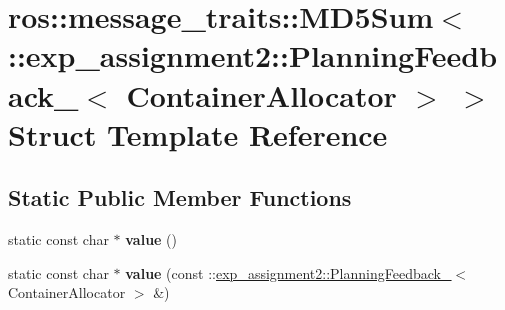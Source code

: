 \hypertarget{structros_1_1message__traits_1_1MD5Sum_3_01_1_1exp__assignment2_1_1PlanningFeedback___3_01ContainerAllocator_01_4_01_4}{}\section{ros\+:\+:message\+\_\+traits\+:\+:M\+D5\+Sum$<$ \+:\+:exp\+\_\+assignment2\+:\+:Planning\+Feedback\+\_\+$<$ Container\+Allocator $>$ $>$ Struct Template Reference}
\label{structros_1_1message__traits_1_1MD5Sum_3_01_1_1exp__assignment2_1_1PlanningFeedback___3_01ContainerAllocator_01_4_01_4}
\subsection*{Static Public Member Functions}
\begin{DoxyCompactItemize}
\item 
\mbox{\label{structros_1_1message__traits_1_1MD5Sum_3_01_1_1exp__assignment2_1_1PlanningFeedback___3_01ContainerAllocator_01_4_01_4_adcc34d48503cddc11c2eb31ab92aea60}} 
static const char $\ast$ {\bfseries value} ()
\item 
\mbox{\label{structros_1_1message__traits_1_1MD5Sum_3_01_1_1exp__assignment2_1_1PlanningFeedback___3_01ContainerAllocator_01_4_01_4_a28815ffe964837d4b7de3d21e241f585}} 
static const char $\ast$ {\bfseries value} (const \+::\hyperlink{structexp__assignment2_1_1PlanningFeedback__}{exp\+\_\+assignment2\+::\+Planning\+Feedback\+\_\+}$<$ Container\+Allocator $>$ \&)
\end{DoxyCompactItemize}
